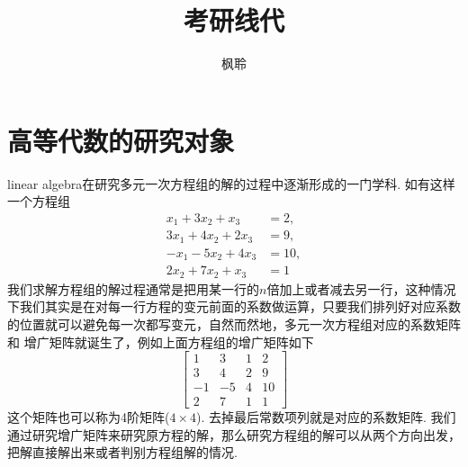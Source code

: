 \documentclass{article}
\begin{document}
\title{考研线代}
\author{枫聆}
\maketitle
\tableofcontents

\newpage 
\section{高等代数的研究对象}

linear algebra在研究多元一次方程组的解的过程中逐渐形成的一门学科. 如有这样一个方程组
$$
\begin{array}{cl}
x_1 + 3x_2 + x_3 &= 2,\\
3x_1 + 4x_2 + 2x_3 &= 9, \\
-x_1 - 5x_2 + 4x_3 &= 10,  \\
2x_2 + 7x_2 + x_3 &= 1
\end{array}
$$
我们求解方程组的解过程通常是把用某一行的$n$倍加上或者减去另一行，这种情况下我们其实是在对每一行方程的变元前面的系数做运算，只要我们排列好对应系数的位置就可以避免每一次都写变元，自然而然地，多元一次方程组对应的{\color{red}系数矩阵}和 {\color{red} 增广矩阵}就诞生了，例如上面方程组的增广矩阵如下
$$
\begin{bmatrix}
1 & 3 & 1 & 2 \\
3 & 4 & 2 & 9 \\
-1 & -5 & 4 & 10  \\
2 & 7 & 1 & 1
\end{bmatrix}
$$
这个矩阵也可以称为4阶矩阵($4 \times 4$). 去掉最后常数项列就是对应的系数矩阵. 我们通过研究增广矩阵来研究原方程的解，那么研究方程组的解可以从两个方向出发，把解直接解出来或者判别方程组解的情况.

\end{document}
